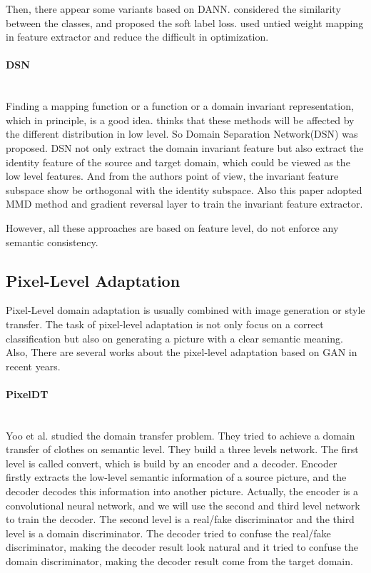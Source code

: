 \documentclass{kththesis}
\begin{document}
\noindent Then, there appear some variants based on DANN. \cite{tzeng2015simultaneous} considered the similarity between the classes, and proposed the soft label loss. \cite{tzeng2017adversarial} used untied weight mapping in feature extractor and reduce the difficult in optimization. 

\paragraph{DSN}~{}\\

\noindent Finding a mapping function or a function or a domain invariant representation, which in principle, is a good idea. \cite{bousmalis2016domain} thinks that these methods will be affected by the different distribution in low level. So Domain Separation Network(DSN) was proposed. DSN not only extract the domain invariant feature but also extract the identity feature of the source and target domain, which could be viewed as the low level features. And from the authors point of view, the invariant feature subspace show be orthogonal with the identity subspace. Also this paper adopted MMD\cite{gretton2012kernel} method and gradient reversal layer\cite{ganin2015unsupervised,ganin2016domain} to train the invariant feature extractor. 

\noindent However, all these approaches are based on feature level, do not enforce any semantic consistency\cite{hoffman2017cycada}. 

\subsection{Pixel-Level Adaptation}

Pixel-Level domain adaptation is usually combined with image generation or style transfer. The task of pixel-level adaptation is not only focus on a correct classification but also on generating a picture with a clear semantic meaning. Also, There are several works about the pixel-level adaptation based on GAN in recent years. 

\paragraph{PixelDT}~{}\\

\noindent Yoo et al.\cite{yoo2016pixel} studied the domain transfer problem. They tried to achieve a domain transfer of clothes on semantic level. They build a three levels network. The first level is called convert, which is build by an encoder and a decoder. Encoder firstly extracts the low-level semantic information of a source picture, and the decoder decodes this information into another picture. Actually, the encoder is a convolutional neural network, and we will use the second and third level network to train the decoder. The second level is a real/fake discriminator and the third level is a domain discriminator. The decoder tried to confuse the real/fake discriminator, making the decoder result look natural and it tried to confuse the domain discriminator, making the decoder result come from the target domain. 
\end{document}
